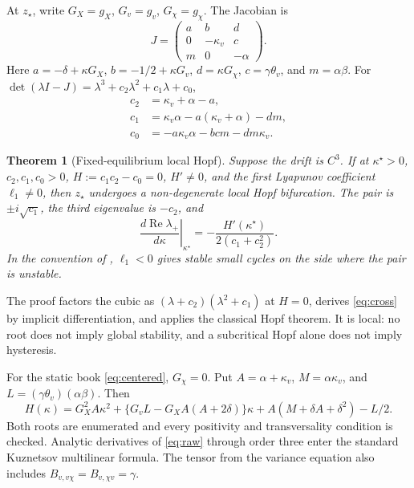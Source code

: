 \documentclass[sigconf,review,anonymous]{acmart}
\newtheorem{theorem}{Theorem}
\begin{document}
At $z_\star$, write $G_X=g_X$, $G_v=g_v$, $G_\chi=g_\chi$. The Jacobian is
\begin{equation}
J=\begin{pmatrix}a&b&d\\0&-\kappa_v&c\\m&0&-\alpha\end{pmatrix}.
\label{eq:J}
\end{equation}
Here $a=-\delta+\kappa G_X$, $b=-1/2+\kappa G_v$,
$d=\kappa G_\chi$, $c=\gamma\theta_v$, and $m=\alpha\beta$.
For $\det(\lambda I-J)=\lambda^3+c_2\lambda^2+c_1\lambda+c_0$,
\begin{align}
c_2&=\kappa_v+\alpha-a,\nonumber\\
c_1&=\kappa_v\alpha-a(\kappa_v+\alpha)-dm,\label{eq:cs}\\
c_0&=-a\kappa_v\alpha-bcm-dm\kappa_v.\nonumber
\end{align}

\begin{theorem}[Fixed-equilibrium local Hopf]
Suppose the drift is $C^3$. If at $\kappa^\star>0$,
$c_2,c_1,c_0>0$, $H:=c_1c_2-c_0=0$, $H'\ne0$, and the first
Lyapunov coefficient $\ell_1\ne0$, then $z_\star$ undergoes a non-degenerate
local Hopf bifurcation. The pair is $\pm i\sqrt{c_1}$, the third eigenvalue is
$-c_2$, and
\begin{equation}
\left.\frac{d\operatorname{Re}\lambda_+}{d\kappa}\right|_{\kappa^\star}
=-\frac{H'(\kappa^\star)}{2(c_1+c_2^2)}.\label{eq:cross}
\end{equation}
In the convention of \citet{kuznetsov2004}, $\ell_1<0$ gives stable small
cycles on the side where the pair is unstable.
\end{theorem}

The proof factors the cubic as $(\lambda+c_2)(\lambda^2+c_1)$ at $H=0$,
derives \eqref{eq:cross} by implicit differentiation, and applies the classical
Hopf theorem. It is local: no root does not imply global stability, and a
subcritical Hopf alone does not imply hysteresis.

For the static book \eqref{eq:centered}, $G_\chi=0$. Put
$A=\alpha+\kappa_v$, $M=\alpha\kappa_v$, and
$L=(\gamma\theta_v)(\alpha\beta)$. Then
\begin{equation}
H(\kappa)=G_X^2A\kappa^2+\{G_vL-G_XA(A+2\delta)\}\kappa
+A(M+\delta A+\delta^2)-L/2.\label{eq:quadratic}
\end{equation}
Both roots are enumerated and every positivity and transversality condition is
checked. Analytic derivatives of \eqref{eq:raw} through order three enter the
standard Kuznetsov multilinear formula. The tensor from the variance equation
also includes $B_{v,v\chi}=B_{v,\chi v}=\gamma$.
\end{document}
